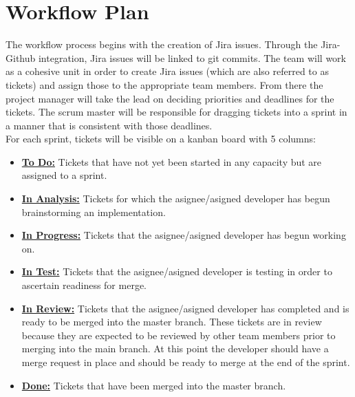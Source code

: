 \documentclass{article}
\begin{document}
\section{Workflow Plan}

The workflow process begins with the creation of Jira issues. Through the Jira-Github integration, Jira issues will be linked to git commits.
The team will work as a cohesive unit in order to create Jira issues (which are also referred to as tickets) and assign those to the appropriate team members. 
From there the project manager will take the lead on deciding priorities and deadlines for the tickets. 
The scrum master will be responsible for dragging tickets into a sprint in a manner that is consistent with those deadlines.\\

For each sprint, tickets will be visible on a kanban board with 5 columns:

\begin{itemize}
	\item \textbf{\underline{To Do:}} Tickets that have not yet been started in any capacity but are assigned to a sprint.
	\item \textbf{\underline{In Analysis:}} Tickets for which the asignee/asigned developer has begun brainstorming an implementation. 
	\item \textbf{\underline{In Progress:}} Tickets that the asignee/asigned developer has begun working on.
	\item \textbf{\underline{In Test:}} Tickets that the asignee/asigned developer is testing in order to ascertain readiness for merge.
	\item \textbf{\underline{In Review:}} Tickets that the asignee/asigned developer has completed and is ready to be merged into the master branch.
	These tickets are in review because they are expected to be reviewed by other team members prior to merging into the main branch. 
	At this point the developer should have a merge request in place and should be ready to merge at the end of the sprint.
	\item \textbf{\underline{Done:}} Tickets that have been merged into the master branch.
\end{itemize} 
\end{document}

